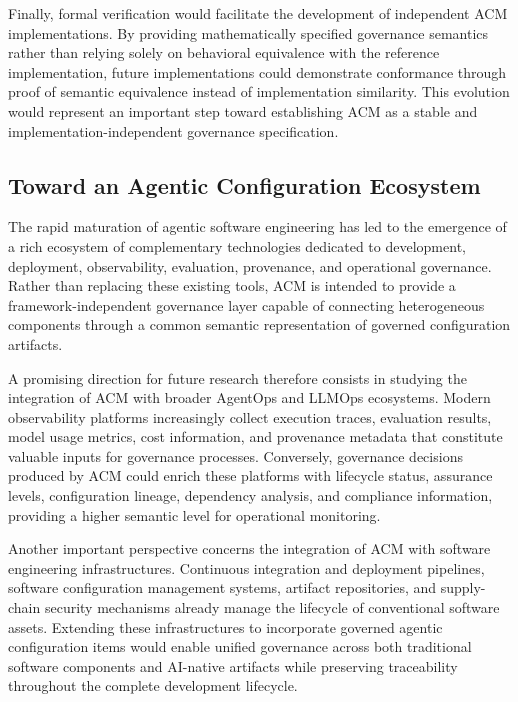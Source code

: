 \documentclass[10pt]{article}
\begin{document}
Finally, formal verification would facilitate the development of independent ACM implementations. By providing mathematically specified governance semantics rather than relying solely on behavioral equivalence with the reference implementation, future implementations could demonstrate conformance through proof of semantic equivalence instead of implementation similarity. This evolution would represent an important step toward establishing ACM as a stable and implementation-independent governance specification.

\subsection{Toward an Agentic Configuration Ecosystem}
\label{sec:future_ecosystem}

The rapid maturation of agentic software engineering has led to the emergence of a rich ecosystem of complementary technologies dedicated to development, deployment, observability, evaluation, provenance, and operational governance. Rather than replacing these existing tools, ACM is intended to provide a framework-independent governance layer capable of connecting heterogeneous components through a common semantic representation of governed configuration artifacts.

A promising direction for future research therefore consists in studying the integration of ACM with broader AgentOps and LLMOps ecosystems. Modern observability platforms increasingly collect execution traces, evaluation results, model usage metrics, cost information, and provenance metadata that constitute valuable inputs for governance processes. Conversely, governance decisions produced by ACM could enrich these platforms with lifecycle status, assurance levels, configuration lineage, dependency analysis, and compliance information, providing a higher semantic level for operational monitoring.

Another important perspective concerns the integration of ACM with software engineering infrastructures. Continuous integration and deployment pipelines, software configuration management systems, artifact repositories, and supply-chain security mechanisms already manage the lifecycle of conventional software assets. Extending these infrastructures to incorporate governed agentic configuration items would enable unified governance across both traditional software components and AI-native artifacts while preserving traceability throughout the complete development lifecycle.
\end{document}
